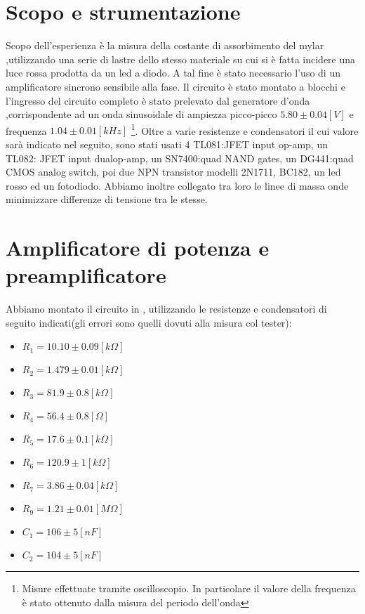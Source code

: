 \section{Scopo e strumentazione}
Scopo dell'esperienza è la misura della costante di assorbimento del mylar ,utilizzando una serie di lastre dello stesso materiale su cui si è fatta incidere una luce rossa prodotta da un led a diodo. A tal fine è stato necessario l'uso di un amplificatore sincrono sensibile alla fase.
Il circuito è stato montato a blocchi e l'ingresso del circuito completo è stato prelevato dal generatore d'onda ,corrispondente ad un onda sinusoidale di ampiezza picco-picco $5.80 \pm 0.04 [V]$ e frequenza $1.04 \pm 0.01 [kHz]$ \footnote{Misure effettuate tramite oscilloscopio. In particolare il valore della frequenza è stato ottenuto dalla misura del periodo dell'onda}.
Oltre a varie resistenze e condensatori il cui valore sarà indicato nel seguito, sono stati usati 4 TL081:JFET input op-amp, un TL082: JFET input dualop-amp, un SN7400:quad NAND gates, un DG441:quad CMOS analog switch, poi due NPN transistor modelli 2N1711, BC182, un led rosso ed un fotodiodo.
Abbiamo inoltre collegato tra loro le linee di massa onde minimizzare differenze di tensione tra le stesse.

\section{Amplificatore di potenza e preamplificatore}
Abbiamo montato il circuito in , utilizzando le resistenze e condensatori di seguito indicati(gli errori sono quelli dovuti alla misura col tester):
\begin{itemize}
\item $R_1=10.10 \pm 0.09[k\Omega]$
\item $R_2=1.479 \pm 0.01[k\Omega]$
\item $R_3=81.9 \pm 0.8[k\Omega]$
\item $R_4=56.4 \pm 0.8[\Omega]$
\item $R_5=17.6 \pm 0.1[k\Omega]$
\item $R_6=120.9 \pm 1[k\Omega]$
\item $R_7=3.86 \pm 0.04[k\Omega]$
\item $R_9=1.21 \pm 0.01[M\Omega]$
\item $C_1=106 \pm 5[nF]$
\item $C_2=104 \pm 5[nF]$
\end{itemize}

